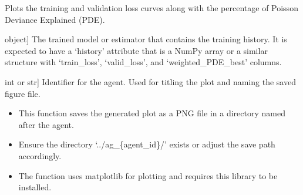 \documentclass[letterpaper,10pt,english]{sphinxmanual}
\begin{document}
\begin{fulllineitems}
\label{\detokenize{utils:utils.training_loss_curve}}
\pysigstartsignatures
{}
\pysigstopsignatures
\sphinxAtStartPar
Plots the training and validation loss curves along with the percentage of Poisson Deviance Explained (PDE).
\begin{description}
\begin{description}
\sphinxlineitem{estimator}{[}object{]}
\sphinxAtStartPar
The trained model or estimator that contains the training history. It is expected
to have a ‘history’ attribute that is a NumPy array or a similar structure with
‘train\_loss’, ‘valid\_loss’, and ‘weighted\_PDE\_best’ columns.

\sphinxlineitem{agent\_id}{[}int or str{]}
\sphinxAtStartPar
Identifier for the agent. Used for titling the plot and naming the saved figure file.

\end{description}

\begin{itemize}
\item {} 
\sphinxAtStartPar
This function saves the generated plot as a PNG file in a directory named after the agent.

\item {} 
\sphinxAtStartPar
Ensure the directory ‘../ag\_\{agent\_id\}/’ exists or adjust the save path accordingly.

\item {} 
\sphinxAtStartPar
The function uses matplotlib for plotting and requires this library to be installed.

\end{itemize}

\end{description}

\end{fulllineitems}

\end{document}
